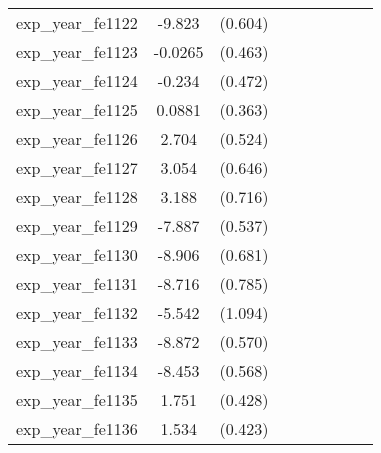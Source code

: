 {\begin{tabular}{l*{4}{cc}}
exp\_year\_fe1122&   -9.823\sym{***}&  (0.604)&                  &         &                  &         &                  &         \\
exp\_year\_fe1123&  -0.0265         &  (0.463)&                  &         &                  &         &                  &         \\
exp\_year\_fe1124&   -0.234         &  (0.472)&                  &         &                  &         &                  &         \\
exp\_year\_fe1125&   0.0881         &  (0.363)&                  &         &                  &         &                  &         \\
exp\_year\_fe1126&    2.704\sym{***}&  (0.524)&                  &         &                  &         &                  &         \\
exp\_year\_fe1127&    3.054\sym{***}&  (0.646)&                  &         &                  &         &                  &         \\
exp\_year\_fe1128&    3.188\sym{***}&  (0.716)&                  &         &                  &         &                  &         \\
exp\_year\_fe1129&   -7.887\sym{***}&  (0.537)&                  &         &                  &         &                  &         \\
exp\_year\_fe1130&   -8.906\sym{***}&  (0.681)&                  &         &                  &         &                  &         \\
exp\_year\_fe1131&   -8.716\sym{***}&  (0.785)&                  &         &                  &         &                  &         \\
exp\_year\_fe1132&   -5.542\sym{***}&  (1.094)&                  &         &                  &         &                  &         \\
exp\_year\_fe1133&   -8.872\sym{***}&  (0.570)&                  &         &                  &         &                  &         \\
exp\_year\_fe1134&   -8.453\sym{***}&  (0.568)&                  &         &                  &         &                  &         \\
exp\_year\_fe1135&    1.751\sym{***}&  (0.428)&                  &         &                  &         &                  &         \\
exp\_year\_fe1136&    1.534\sym{***}&  (0.423)&                  &         &                  &         &                  &         \\

\end{tabular}}
